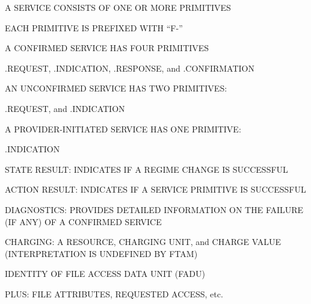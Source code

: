 \begin{bwslide}

\begin{nrtc}
\item	A SERVICE CONSISTS OF ONE OR MORE PRIMITIVES

\item	EACH PRIMITIVE IS PREFIXED WITH ``F-''

\item	A CONFIRMED SERVICE HAS FOUR PRIMITIVES
    \begin{nrtc}
    \item	.REQUEST, .INDICATION, .RESPONSE, and .CONFIRMATION
    \end{nrtc}

\item	AN UNCONFIRMED SERVICE HAS TWO PRIMITIVES:
    \begin{nrtc}
    \item	.REQUEST,  and .INDICATION
    \end{nrtc}

\item	A PROVIDER-INITIATED SERVICE HAS ONE PRIMITIVE:
    \begin{nrtc}
    \item	.INDICATION
    \end{nrtc}
\end{nrtc}
\end{bwslide}




\begin{bwslide}

\begin{nrtc}
\item	STATE RESULT: INDICATES IF A REGIME CHANGE IS SUCCESSFUL

\item	ACTION RESULT: INDICATES IF A SERVICE PRIMITIVE IS SUCCESSFUL

\item	DIAGNOSTICS: PROVIDES DETAILED INFORMATION ON THE FAILURE
	(IF ANY) OF A CONFIRMED SERVICE

\item	CHARGING: A RESOURCE, CHARGING UNIT, and CHARGE VALUE\\
	(INTERPRETATION IS UNDEFINED BY FTAM)

\item	IDENTITY OF FILE ACCESS DATA UNIT (FADU)

\item	PLUS: FILE ATTRIBUTES, REQUESTED ACCESS, etc.
\end{nrtc}
\end{bwslide}



